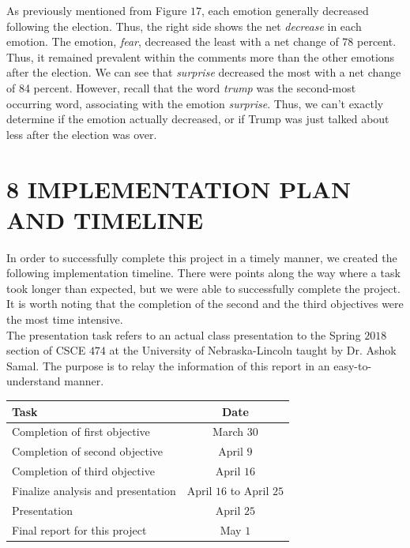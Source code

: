 \documentclass[letterpaper]{article}
\begin{document}
As previously mentioned from Figure $17$, each emotion generally decreased following the election. Thus, the right side shows the net \textit{decrease} in each emotion. The emotion, \textit{fear}, decreased the least with a net change of 78 percent. Thus, it remained prevalent within the comments more than the other emotions after the election. We can see that \textit{surprise} decreased the most with a net change of 84 percent. However, recall that the word \textit{trump} was the second-most occurring word, associating with the emotion \textit{surprise}. Thus, we can't exactly determine if the emotion actually decreased, or if Trump was just talked about less after the election was over.


\section{8 IMPLEMENTATION PLAN AND TIMELINE}

In order to successfully complete this project in a timely manner, we created the following implementation timeline. There were points along the way where a task took longer than expected, but we were able to successfully complete the project. It is worth noting that the completion of the second and the third objectives were the most time intensive. \\

\noindent
The presentation task refers to an actual class presentation to the Spring $2018$ section of CSCE $474$ at the University of Nebraska-Lincoln taught by Dr. Ashok Samal. The purpose is to relay the information of this report in an easy-to-understand manner.

\begin{center}
\begin{tabular}{ | l | c | } 
\hline
\textbf{Task} & \textbf{Date} \\ 
\hline
Completion of first objective &  March $30$ \\ 
\hline
Completion of second objective & April $9$ \\ 
\hline
Completion of third objective & April $16$ \\ 
 \hline
Finalize analysis and presentation & April $16$ to April $25$ \\ 
\hline
Presentation & April $25$ \\
\hline
Final report for this project & May $1$ \\ 
\hline
\end{tabular}
\end{center}

\footnotesize


\end{document}
